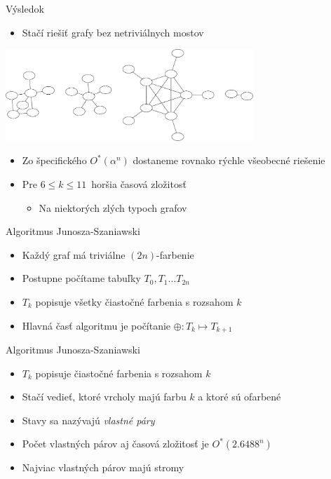 \documentclass[slovak]{beamer}
\begin{document}
\begin{frame}{Výsledok}
    \begin{itemize}
        \item Stačí riešiť grafy bez netriviálnych mostov
    \end{itemize}
    \begin{center}
        \includegraphics[width=0.7\textwidth]{grafy/ec2-example.pdf}
    \end{center}
    \begin{itemize}
        \item Zo špecifického $O^*(\alpha^n)$ dostaneme rovnako
        rýchle všeobecné riešenie
        \item Pre $6 \leq k \leq 11$ horšia časová zložitosť
        \begin{itemize}
            \item Na niektorých zlých typoch grafov
        \end{itemize}
    \end{itemize}
\end{frame}

\begin{frame}{Algoritmus Junosza-Szaniawski}
    \begin{itemize}
        \item Každý graf má triviálne $(2n)$-farbenie
        \item Postupne počítame tabuľky $T_0, T_1 \ldots T_{2n}$
        \item $T_k$ popisuje všetky čiastočné farbenia s rozsahom $k$
        \item Hlavná časť algoritmu je počítanie $\oplus: T_k \mapsto T_{k+1}$
    \end{itemize}
\end{frame}

\begin{frame}{Algoritmus Junosza-Szaniawski}
    \begin{itemize}
        \item $T_k$ popisuje čiastočné farbenia s rozsahom $k$
        \item Stačí vedieť, ktoré vrcholy majú farbu $k$ a ktoré sú ofarbené
        \item Stavy sa nazývajú \emph{vlastné páry}
        \item Počet vlastných párov aj časová zložitosť je $O^*(2.6488^n)$
        \item Najviac vlastných párov majú stromy
    \end{itemize}
\end{frame}
\end{document}
